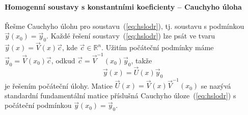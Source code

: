 \paragraph{Homogenní soustavy s konstantními koeficienty -- Cauchyho úloha}
Řešme Cauchyho úlohu pro soustavu~(\ref{eq:hslodr}), tj. soustavu s podmínkou $\vec{y}(x_0)=\vec{y}_0$.
Každé řešení soustavy~(\ref{eq:hslodr}) lze psát ve tvaru $\vec{y}(x)=\vec{V}(x)\vec{c}$,
kde $\vec{c}\in\mathbb{R}^n$.
Užitím počáteční podmínky máme $\vec{y}_0=\vec{V}(x_0)\vec{c}$, odkud $\vec{c} = \vec{V}^{-1}(x_0)\vec{y}_0$,
takže
\[
   \vec{y}(x) = \vec{U}(x)\vec{y}_0
\]
je řešením počáteční úlohy.
Matice $\vec{U}(x) = \vec{V}(x)\vec{V}^{-1}(x_0)$ se nazývá standardní fundamentální matice
příslušná Cauchyho úloze~(\ref{eq:hslodr}) s počáteční podmínkou $\vec{y}(x_0)=\vec{y}_0$.

